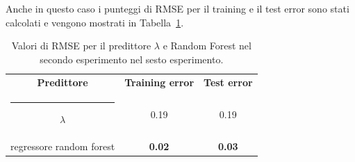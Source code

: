 \documentclass[12pt]{report}
\makeatletter
\theoremstyle{definition}
\newcommand{\thickhline}{%
    \noalign {\ifnum 0=`}\fi \hrule height 1pt
    \futurelet \reserved@a \@xhline
}
\makeatother
\begin{document}
Anche in questo caso i punteggi di RMSE per il training e il test error sono stati calcolati e vengono mostrati in Tabella~\ref{rmse_exp6}. 
\begin{table}
\centering
\begin{adjustbox}{max width=\textwidth}
 \begin{tabular}{|c|c|c|} 
 \hline
\textbf{Predittore} & \textbf{Training error} & \textbf{Test error}
\\ [0.5ex] 
 \thickhline
 $\lambda$ & 0.19 & 0.19 \\
 regressore random forest & \textbf{0.02} & \textbf{0.03}
 \\
 \hline
\end{tabular}
\end{adjustbox}
\caption{Valori di RMSE per il predittore $\lambda$ e Random Forest nel secondo esperimento nel sesto esperimento.}
\label{rmse_exp6}
\end{table}
\end{document}
